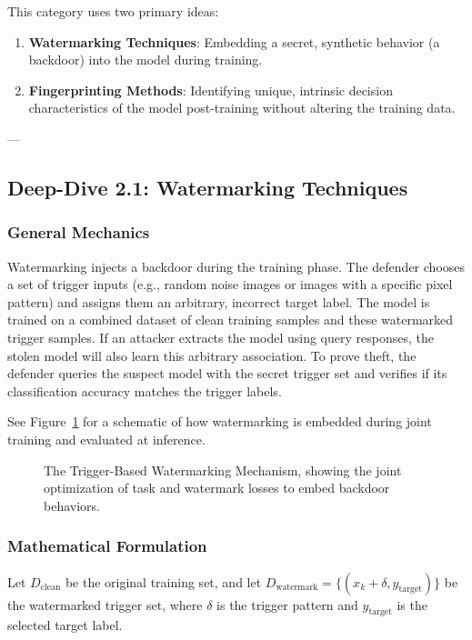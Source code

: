 \documentclass{article}
\begin{document}
This category uses two primary ideas:
\begin{enumerate}
    \item \textbf{Watermarking Techniques}: Embedding a secret, synthetic behavior (a backdoor) into the model during training.
    \item \textbf{Fingerprinting Methods}: Identifying unique, intrinsic decision characteristics of the model post-training without altering the training data.
\end{enumerate}

---

\subsection{Deep-Dive 2.1: Watermarking Techniques}

\subsubsection{General Mechanics}
Watermarking injects a backdoor during the training phase. The defender chooses a set of trigger inputs (e.g., random noise images or images with a specific pixel pattern) and assigns them an arbitrary, incorrect target label. The model is trained on a combined dataset of clean training samples and these watermarked trigger samples.
If an attacker extracts the model using query responses, the stolen model will also learn this arbitrary association. To prove theft, the defender queries the suspect model with the secret trigger set and verifies if its classification accuracy matches the trigger labels.

See Figure~\ref{fig:watermarking_mechanism} for a schematic of how watermarking is embedded during joint training and evaluated at inference.

\begin{figure}[htbp]
    \centering
    \caption{The Trigger-Based Watermarking Mechanism, showing the joint optimization of task and watermark losses to embed backdoor behaviors.}
    \label{fig:watermarking_mechanism}
\end{figure}

\subsubsection{Mathematical Formulation}
Let $D_{\text{clean}}$ be the original training set, and let $D_{\text{watermark}} = \{(x_k + \delta, y_{\text{target}})\}$ be the watermarked trigger set, where $\delta$ is the trigger pattern and $y_{\text{target}}$ is the selected target label.
\end{document}
